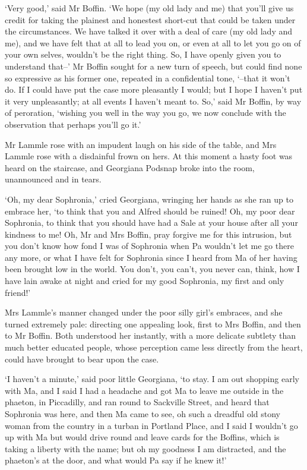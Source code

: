 ‘Very good,’ said Mr Boffin. ‘We hope (my old lady and me) that you’ll
give us credit for taking the plainest and honestest short-cut that
could be taken under the circumstances. We have talked it over with a
deal of care (my old lady and me), and we have felt that at all to lead
you on, or even at all to let you go on of your own selves, wouldn’t be
the right thing. So, I have openly given you to understand that--’
Mr Boffin sought for a new turn of speech, but could find none so
expressive as his former one, repeated in a confidential tone, ‘--that
it won’t do. If I could have put the case more pleasantly I would; but
I hope I haven’t put it very unpleasantly; at all events I haven’t meant
to. So,’ said Mr Boffin, by way of peroration, ‘wishing you well in the
way you go, we now conclude with the observation that perhaps you’ll go
it.’

Mr Lammle rose with an impudent laugh on his side of the table, and Mrs
Lammle rose with a disdainful frown on hers. At this moment a hasty foot
was heard on the staircase, and Georgiana Podsnap broke into the room,
unannounced and in tears.

‘Oh, my dear Sophronia,’ cried Georgiana, wringing her hands as she ran
up to embrace her, ‘to think that you and Alfred should be ruined! Oh,
my poor dear Sophronia, to think that you should have had a Sale at your
house after all your kindness to me! Oh, Mr and Mrs Boffin, pray forgive
me for this intrusion, but you don’t know how fond I was of Sophronia
when Pa wouldn’t let me go there any more, or what I have felt for
Sophronia since I heard from Ma of her having been brought low in the
world. You don’t, you can’t, you never can, think, how I have lain awake
at night and cried for my good Sophronia, my first and only friend!’

Mrs Lammle’s manner changed under the poor silly girl’s embraces, and
she turned extremely pale: directing one appealing look, first to Mrs
Boffin, and then to Mr Boffin. Both understood her instantly, with
a more delicate subtlety than much better educated people, whose
perception came less directly from the heart, could have brought to bear
upon the case.

‘I haven’t a minute,’ said poor little Georgiana, ‘to stay. I am out
shopping early with Ma, and I said I had a headache and got Ma to leave
me outside in the phaeton, in Piccadilly, and ran round to Sackville
Street, and heard that Sophronia was here, and then Ma came to see, oh
such a dreadful old stony woman from the country in a turban in Portland
Place, and I said I wouldn’t go up with Ma but would drive round and
leave cards for the Boffins, which is taking a liberty with the name;
but oh my goodness I am distracted, and the phaeton’s at the door, and
what would Pa say if he knew it!’

